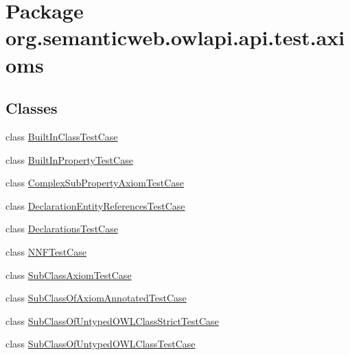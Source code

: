 \hypertarget{namespaceorg_1_1semanticweb_1_1owlapi_1_1api_1_1test_1_1axioms}{\section{Package org.\-semanticweb.\-owlapi.\-api.\-test.\-axioms}
\label{namespaceorg_1_1semanticweb_1_1owlapi_1_1api_1_1test_1_1axioms}
}
\subsection*{Classes}
\begin{DoxyCompactItemize}
\item 
class \hyperlink{classorg_1_1semanticweb_1_1owlapi_1_1api_1_1test_1_1axioms_1_1_built_in_class_test_case}{Built\-In\-Class\-Test\-Case}
\item 
class \hyperlink{classorg_1_1semanticweb_1_1owlapi_1_1api_1_1test_1_1axioms_1_1_built_in_property_test_case}{Built\-In\-Property\-Test\-Case}
\item 
class \hyperlink{classorg_1_1semanticweb_1_1owlapi_1_1api_1_1test_1_1axioms_1_1_complex_sub_property_axiom_test_case}{Complex\-Sub\-Property\-Axiom\-Test\-Case}
\item 
class \hyperlink{classorg_1_1semanticweb_1_1owlapi_1_1api_1_1test_1_1axioms_1_1_declaration_entity_references_test_case}{Declaration\-Entity\-References\-Test\-Case}
\item 
class \hyperlink{classorg_1_1semanticweb_1_1owlapi_1_1api_1_1test_1_1axioms_1_1_declarations_test_case}{Declarations\-Test\-Case}
\item 
class \hyperlink{classorg_1_1semanticweb_1_1owlapi_1_1api_1_1test_1_1axioms_1_1_n_n_f_test_case}{N\-N\-F\-Test\-Case}
\item 
class \hyperlink{classorg_1_1semanticweb_1_1owlapi_1_1api_1_1test_1_1axioms_1_1_sub_class_axiom_test_case}{Sub\-Class\-Axiom\-Test\-Case}
\item 
class \hyperlink{classorg_1_1semanticweb_1_1owlapi_1_1api_1_1test_1_1axioms_1_1_sub_class_of_axiom_annotated_test_case}{Sub\-Class\-Of\-Axiom\-Annotated\-Test\-Case}
\item 
class \hyperlink{classorg_1_1semanticweb_1_1owlapi_1_1api_1_1test_1_1axioms_1_1_sub_class_of_untyped_o_w_l_class_strict_test_case}{Sub\-Class\-Of\-Untyped\-O\-W\-L\-Class\-Strict\-Test\-Case}
\item 
class \hyperlink{classorg_1_1semanticweb_1_1owlapi_1_1api_1_1test_1_1axioms_1_1_sub_class_of_untyped_o_w_l_class_test_case}{Sub\-Class\-Of\-Untyped\-O\-W\-L\-Class\-Test\-Case}

\end{DoxyCompactItemize}
